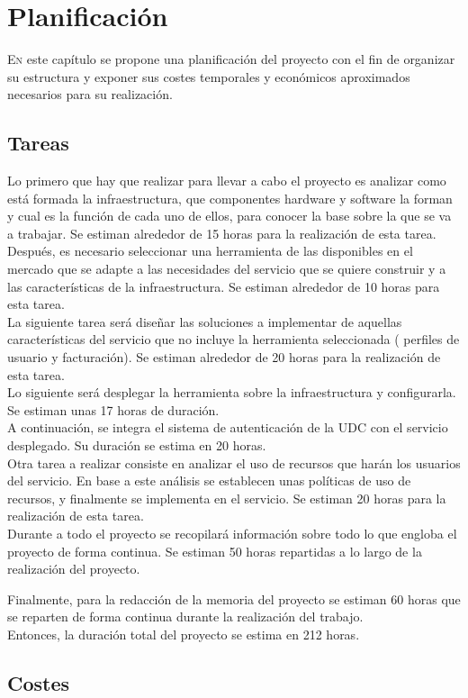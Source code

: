 \chapter{Planificación}
\label{chap:planificacionProyecto}
\lettrine{E}{n} este capítulo se propone una planificación del proyecto con el fin de organizar su estructura y exponer sus costes temporales y económicos aproximados necesarios para su realización.

\section{Tareas}
Lo primero que hay que realizar para llevar a cabo el proyecto es analizar como está formada la infraestructura, que componentes hardware y software la forman y cual es la función de cada uno de ellos, para conocer la base sobre la que se va a trabajar. Se estiman alrededor de 15 horas para la realización de esta tarea.\\

Después, es necesario seleccionar una herramienta de las disponibles en el mercado que se adapte a las necesidades del servicio que se quiere construir y a las características de la infraestructura. Se estiman alrededor de 10 horas para esta tarea.\\

La siguiente tarea será diseñar las soluciones a implementar de aquellas características del servicio que no incluye la herramienta seleccionada ( perfiles de usuario y facturación). Se estiman alrededor de 20 horas para la realización de esta tarea.\\
Lo siguiente será desplegar la herramienta sobre la infraestructura y configurarla. Se estiman unas 17 horas de duración.\\

A continuación, se integra el sistema de autenticación de la UDC con el servicio desplegado. Su duración se estima en 20 horas.\\

Otra tarea a realizar consiste en analizar el uso de recursos que harán los usuarios del servicio. En base a este análisis se establecen unas políticas de uso de recursos, y finalmente se implementa en el servicio. Se estiman 20 horas para la realización de esta tarea.\\

Durante a todo el proyecto se recopilará información sobre todo lo que engloba el proyecto de forma continua. Se estiman 50 horas repartidas a lo largo de la realización del proyecto.

Finalmente, para la redacción de la memoria del proyecto se estiman 60 horas que se reparten de forma continua durante la realización del trabajo.\\
Entonces, la duración total del proyecto se estima en 212 horas.

\section{Costes}